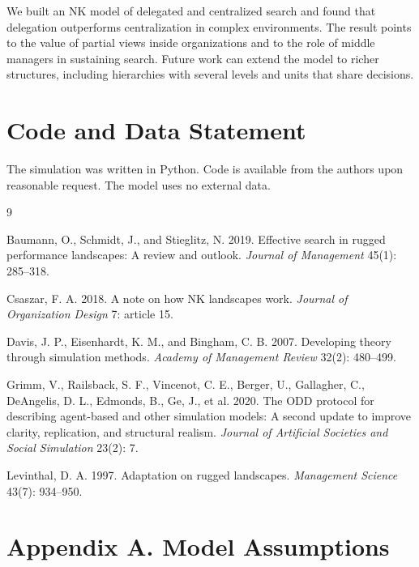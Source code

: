 \documentclass[11pt]{article}
\begin{document}
We built an NK model of delegated and centralized search and found that delegation outperforms centralization in complex environments. The result points to the value of partial views inside organizations and to the role of middle managers in sustaining search. Future work can extend the model to richer structures, including hierarchies with several levels and units that share decisions.

\section*{Code and Data Statement}

The simulation was written in Python. Code is available from the authors upon reasonable request. The model uses no external data.

\begin{thebibliography}{9}

Baumann, O., Schmidt, J., and Stieglitz, N. 2019. Effective search in rugged performance landscapes: A review and outlook. \textit{Journal of Management} 45(1): 285--318.

Csaszar, F. A. 2018. A note on how NK landscapes work. \textit{Journal of Organization Design} 7: article 15.

Davis, J. P., Eisenhardt, K. M., and Bingham, C. B. 2007. Developing theory through simulation methods. \textit{Academy of Management Review} 32(2): 480--499.

Grimm, V., Railsback, S. F., Vincenot, C. E., Berger, U., Gallagher, C., DeAngelis, D. L., Edmonds, B., Ge, J., et al. 2020. The ODD protocol for describing agent-based and other simulation models: A second update to improve clarity, replication, and structural realism. \textit{Journal of Artificial Societies and Social Simulation} 23(2): 7.

Levinthal, D. A. 1997. Adaptation on rugged landscapes. \textit{Management Science} 43(7): 934--950.

\end{thebibliography}

\clearpage
\appendix
\section*{Appendix A. Model Assumptions}
\renewcommand{\thetable}{A\arabic{table}}
\renewcommand{\thefigure}{A\arabic{figure}}
\setcounter{table}{0}
\setcounter{figure}{0}
\end{document}
